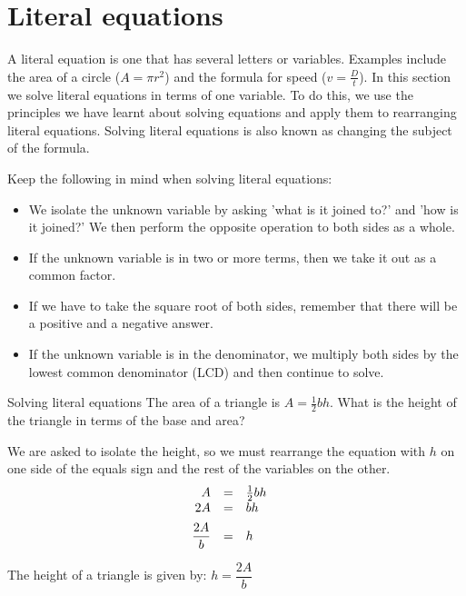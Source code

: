 \section{Literal equations}

A literal equation is one that has several letters or variables. Examples include the area of a circle ($A=\pi{r}^{2}$) and the formula for speed ($v=\frac{D}{t}$). In this section we solve literal equations in terms of one variable. To do this, we use the principles we have learnt about solving equations and apply them to rearranging literal equations. Solving literal equations is also known as changing the subject of the formula.
 
Keep the following in mind when solving literal equations:
\begin{itemize}
\item We isolate the unknown variable by asking 'what is it joined to?' and 'how is it joined?' We then perform the opposite operation to both sides as a whole.
\item If the unknown variable is in two or more terms, then we take it out as a common factor. 
\item  If we have to take the square root of both sides, remember that there will be a positive and a negative answer.
\item  If the unknown variable is in the denominator, we multiply both sides by the lowest common denominator (LCD) and then continue to solve.
\end{itemize}

\begin{wex}
{Solving literal equations}
{
The area of a triangle is $A=\frac{1}{2}bh$. What is the height of the triangle in terms of the base and area?
}
{
We are asked to isolate the height, so we must rearrange the equation with $h$ on one side of the equals sign and the rest of the variables on the other.
\begin{equation*}
    \begin{array}{cccc}\hfill A& =& \frac{1}{2}bh\hfill & \\
	\hfill 2A& =& bh\hfill & \hfill \vspace{5pt}\\
	\hfill \dfrac{2A}{b}& =& h\hfill 
    \end{array}
\end{equation*}

The height of a triangle is given by: $h=\dfrac{2A}{b}$
} 
\end{wex}

